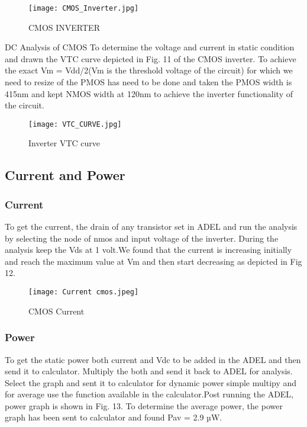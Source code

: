 \documentclass[conference]{IEEEtran}
\begin{document}
 \begin{figure}
     \centering
     \texttt{[image: CMOS\_Inverter.jpg]}
     \caption{CMOS INVERTER}
     \label{fig:enter-label}
 \end{figure}







{DC Analysis of CMOS}
 To determine the voltage and current in static condition and drawn the VTC curve depicted in Fig. 11 of the CMOS inverter. To achieve the exact Vm = Vdd/2(Vm is the threshold voltage of the circuit) for which we need to resize of the PMOS has need to be done and taken the PMOS width is 415nm and kept NMOS width at 120nm to achieve the inverter functionality of the circuit.
\begin{figure}
    \centering
    \texttt{[image: VTC\_CURVE.jpg]}
    \caption{Inverter VTC curve}
    \label{fig:enter-label}
\end{figure}


\subsection{Current and Power}
\subsubsection{Current}
To get  the current, the drain of any transistor set in ADEL and run the analysis by selecting the node of nmos and input voltage of the inverter. During the analysis keep the Vds at 1 volt.We found that the current is increasing initially and reach the maximum value at Vm and then start decreasing as depicted in Fig 12.
\begin{figure}
    \centering
    \texttt{[image: Current cmos.jpeg]}
    \caption{CMOS Current}
    \label{fig:enter-label}
\end{figure}


\subsubsection{Power}
To get the static power both current and Vdc to be added in the ADEL and then send it to calculator. Multiply the both and send it back to ADEL for analysis. Select the graph and sent it to calculator for dynamic power simple multipy and for average use the function available in the  calculator.Post running the ADEL, power graph is shown in Fig. 13. To determine the average power, the power graph has been sent to calculator and found Pav = 2.9 µW.
\end{document}
